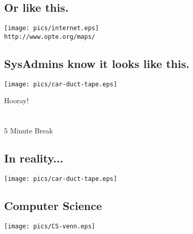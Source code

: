 \documentclass[xga]{xdvislides}
\begin{document}
\subsection{Or like this.}
\begin{center}
	\texttt{[image: pics/internet.eps]} \\
	\small
	{\tt http://www.opte.org/maps/}
	\Normalsize
\end{center}

\subsection{SysAdmins know it looks like this.}
\vspace*{\fill}
\begin{center}
    \texttt{[image: pics/car-duct-tape.eps]}
\end{center}
\vspace*{\fill}

\newpage
\vspace*{\fill}
\begin{center}
    \Hugesize
        Hooray! \\ [1em]
    \hspace*{5mm}
    \blueline\\
    \hspace*{5mm}\\
        5 Minute Break
\end{center}
\vspace*{\fill}

\subsection{In reality...}
\vspace*{\fill}
\begin{center}
    \texttt{[image: pics/car-duct-tape.eps]}
\end{center}
\vspace*{\fill}

\subsection{Computer Science}
\vspace*{\fill}
\begin{center}
	\texttt{[image: pics/CS-venn.eps]}
\Normalsize
\end{center}
\vspace*{\fill}
\end{document}
